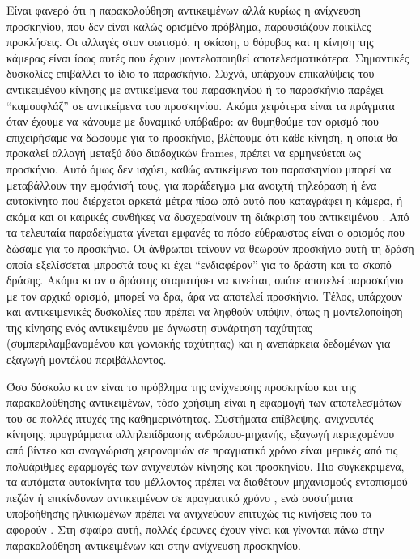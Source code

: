\documentclass[11pt,a4paper,english,greek,twoside]{../Thesis}
\begin{document}
\par Είναι φανερό ότι η παρακολούθηση αντικειμένων αλλά κυρίως η ανίχνευση προσκηνίου, που δεν είναι καλώς ορισμένο πρόβλημα, παρουσιάζουν ποικίλες προκλήσεις. Οι αλλαγές στον φωτισμό, η σκίαση, ο θόρυβος και η κίνηση της κάμερας είναι ίσως αυτές που έχουν μοντελοποιηθεί αποτελεσματικότερα. Σημαντικές δυσκολίες επιβάλλει το ίδιο το παρασκήνιο. Συχνά, υπάρχουν επικαλύψεις του αντικειμένου κίνησης με αντικείμενα του παρασκηνίου ή το παρασκήνιο παρέχει “καμουφλάζ” σε αντικείμενα του προσκηνίου. Ακόμα χειρότερα είναι τα πράγματα όταν έχουμε να κάνουμε με δυναμικό υπόβαθρο: αν θυμηθούμε τον ορισμό που επιχειρήσαμε να δώσουμε για το προσκήνιο, βλέπουμε ότι κάθε κίνηση, η οποία θα προκαλεί αλλαγή μεταξύ δύο διαδοχικών frames, πρέπει να ερμηνεύεται ως προσκήνιο. Αυτό όμως δεν ισχύει, καθώς αντικείμενα του παρασκηνίου μπορεί να μεταβάλλουν την εμφάνισή τους, για παράδειγμα μια ανοιχτή τηλεόραση ή ένα αυτοκίνητο που διέρχεται αρκετά μέτρα πίσω από αυτό που καταγράφει η κάμερα, ή ακόμα και οι καιρικές συνθήκες να δυσχεραίνουν τη διάκριση του αντικειμένου \cite{prasad_2016}. Από τα τελευταία παραδείγματα γίνεται εμφανές το πόσο εύθραυστος είναι ο ορισμός που δώσαμε για το προσκήνιο. Οι άνθρωποι τείνουν να θεωρούν προσκήνιο αυτή τη δράση οποία εξελίσσεται μπροστά τους κι έχει “ενδιαφέρον” για το δράστη και το σκοπό δράσης. Ακόμα κι αν ο δράστης σταματήσει να κινείται, οπότε αποτελεί παρασκήνιο με τον αρχικό ορισμό, μπορεί να δρα, άρα να αποτελεί προσκήνιο. Τέλος, υπάρχουν και αντικειμενικές δυσκολίες που πρέπει να ληφθούν υπόψιν, όπως η μοντελοποίηση της κίνησης ενός αντικειμένου με άγνωστη συνάρτηση ταχύτητας (συμπεριλαμβανομένου και γωνιακής ταχύτητας) και η ανεπάρκεια δεδομένων για εξαγωγή μοντέλου περιβάλλοντος.

\par Όσο δύσκολο κι αν είναι το πρόβλημα της ανίχνευσης προσκηνίου και της παρακολούθησης αντικειμένων, τόσο χρήσιμη είναι η εφαρμογή των αποτελεσμάτων του σε πολλές πτυχές της καθημερινότητας. Συστήματα επίβλεψης, ανιχνευτές κίνησης, προγράμματα αλληλεπίδρασης ανθρώπου-μηχανής, εξαγωγή περιεχομένου από βίντεο και αναγνώριση χειρονομιών σε πραγματικό χρόνο είναι μερικές από τις πολυάριθμες εφαρμογές των ανιχνευτών κίνησης και προσκηνίου. Πιο συγκεκριμένα, τα αυτόματα αυτοκίνητα του μέλλοντος πρέπει να διαθέτουν μηχανισμούς εντοπισμού πεζών ή επικίνδυνων αντικειμένων σε πραγματικό χρόνο \cite{dollar_2010}, ενώ συστήματα υποβοήθησης ηλικιωμένων πρέπει να ανιχνεύουν επιτυχώς τις κινήσεις που τα αφορούν \cite{rodomagoulakis_2016}. Στη σφαίρα αυτή, πολλές έρευνες έχουν γίνει και γίνονται πάνω στην παρακολούθηση αντικειμένων και στην ανίχνευση προσκηνίου.
\end{document}
